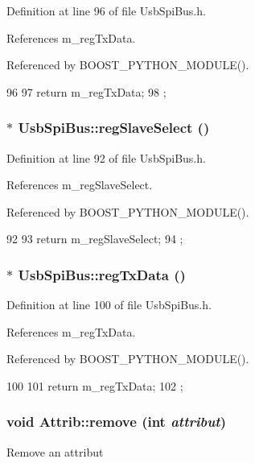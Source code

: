 Definition at line 96 of file UsbSpiBus.h.

References m\_\-regTxData.

Referenced by BOOST\_\-PYTHON\_\-MODULE().


\begin{DoxyCode}
96                         {
97     return m_regTxData;
98   };
\end{DoxyCode}
\hypertarget{classUsbSpiBus_a9bc70ad9842d8aa8f89b24599bfd6238}{
\subsubsection[{regSlaveSelect}]{$\ast$ UsbSpiBus::regSlaveSelect ()}}
\label{classUsbSpiBus_a9bc70ad9842d8aa8f89b24599bfd6238}


Definition at line 92 of file UsbSpiBus.h.

References m\_\-regSlaveSelect.

Referenced by BOOST\_\-PYTHON\_\-MODULE().


\begin{DoxyCode}
92                              {
93     return m_regSlaveSelect;
94   };
\end{DoxyCode}
\hypertarget{classUsbSpiBus_ab8044b2af7209f9eb37c0a96e3e28637}{
\subsubsection[{regTxData}]{$\ast$ UsbSpiBus::regTxData ()}}
\label{classUsbSpiBus_ab8044b2af7209f9eb37c0a96e3e28637}


Definition at line 100 of file UsbSpiBus.h.

References m\_\-regTxData.

Referenced by BOOST\_\-PYTHON\_\-MODULE().


\begin{DoxyCode}
100                         {
101     return m_regTxData;
102   };
\end{DoxyCode}
\hypertarget{classAttrib_a7d4ef7e32d93cb287792b87b857e79f3}{
\subsubsection[{remove}]{\setlength{\rightskip}{0pt plus 5cm}void Attrib::remove (int {\em attribut})}}
\label{classAttrib_a7d4ef7e32d93cb287792b87b857e79f3}
Remove an attribut 

